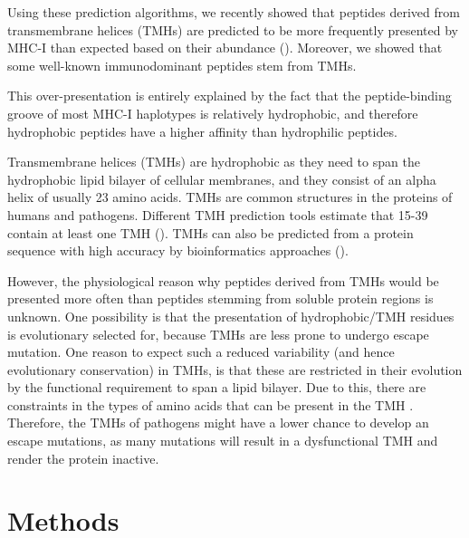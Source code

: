 Using these prediction algorithms, 
we recently showed that peptides derived 
from transmembrane helices (TMHs) 
are predicted to be more frequently presented by MHC-I 
than expected based on their abundance (\cite{bianchi2017}). 
Moreover, we showed that some well-known immunodominant peptides stem from TMHs. 

This over-presentation is entirely explained by the fact 
that the peptide-binding groove of most MHC-I haplotypes 
is relatively hydrophobic, 
and therefore hydrophobic peptides have a higher affinity 
than hydrophilic peptides. 

Transmembrane helices (TMHs) are hydrophobic 
as they need to span the hydrophobic lipid bilayer of cellular membranes, 
and they consist of an alpha helix of usually 23 amino acids. 
TMHs are common structures in the proteins of humans and pathogens. 
Different TMH prediction tools estimate
that 15-39%
contain at least one TMH (\cite{ahram2006estimation}). 
TMHs can also be predicted from a protein sequence 
with high accuracy by bioinformatics approaches (\cite{krogh2001predicting,bianchi2017,kall2004combined,arai2004conpred,jones2007improving,klammer2009metatm,wang2019efficient}).

However, the physiological reason why peptides derived from TMHs 
would be presented more often than peptides 
stemming from soluble protein regions is unknown. 
One possibility is that the presentation of 
hydrophobic/TMH residues is evolutionary selected for, 
because TMHs are less prone to undergo escape mutation. 
One reason to expect such a reduced 
variability (and hence evolutionary conservation) in TMHs, 
is that these are restricted in their evolution 
by the functional requirement to span a lipid bilayer. 
Due to this, there are constraints in the types of amino acids 
that can be present in the TMH . 
Therefore, the TMHs of pathogens 
might have a lower chance to develop an escape mutations, 
as many mutations will result in a dysfunctional TMH 
and render the protein inactive.


\section{Methods}

